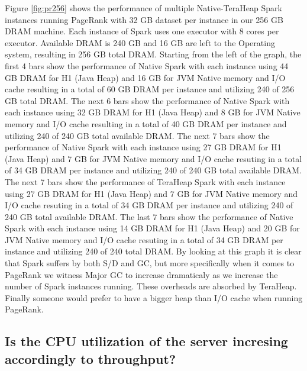 Figure \ref{fig:pr256} shows the performance of multiple Native-TeraHeap
Spark instances running PageRank with 32 GB dataset per instance in
our 256 GB DRAM machine. Each instance of Spark uses one executor with
8 cores per executor. Available DRAM is 240 GB and 16 GB are left to
the Operating system, resulting in 256 GB total DRAM. Starting from
the left of the graph, the first 4 bars show the performance of Native
Spark with each instance using 44 GB DRAM for H1 (Java Heap) and 16 GB
for JVM Native memory and I/O cache resulting in a total of 60 GB DRAM
per instance and utilizing 240 of 256 GB total DRAM. The next 6 bars
show the performance of Native Spark with each instance using 32 GB
DRAM for H1 (Java Heap) and 8 GB for JVM Native memory and I/O cache
resulting in a total of 40 GB DRAM per instance and utilizing 240 of
240 GB total available DRAM. The next 7 bars show the performance of
Native Spark with each instance using 27 GB DRAM for H1 (Java Heap)
and 7 GB for JVM Native memory and I/O cache resuting in a total of 34
GB DRAM per instance and utilizing 240 of 240 GB total available DRAM.
The next 7 bars show the performance of TeraHeap Spark with each
instance using 27 GB DRAM for H1 (Java Heap) and 7 GB for JVM Native
memory and I/O cache resuting in a total of 34 GB DRAM per instance
and utilizing 240 of 240 GB total available DRAM. The last 7 bars show
the performance of Native Spark with each instance using 14 GB DRAM
for H1 (Java Heap) and 20 GB for JVM Native memory and I/O cache
resuting in a total of 34 GB DRAM per instance and utilizing 240 of
240 total DRAM. By looking at this graph it is clear that Spark
suffers by both S/D and GC, but more specifically when it comes to
PageRank we witness Major GC to increase dramaticaly as we increase
the number of Spark instances running. These overheads are absorbed by
TeraHeap. Finally someone would prefer to have a bigger heap than I/O
cache when running PageRank.

\subsection{Is the CPU utilization of the server incresing
accordingly to throughput?}

